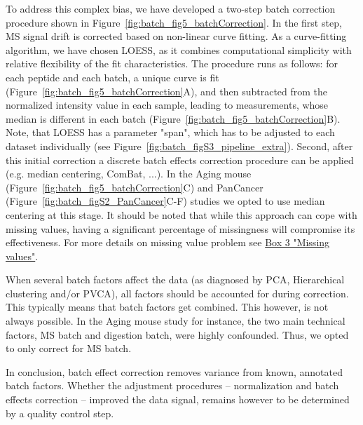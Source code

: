 \documentclass[num-refs]{wiley-article}
\begin{document}
To address this complex bias, we have developed a two-step batch correction procedure shown in Figure~\ref{fig:batch_fig5_batchCorrection}. In the first step, MS signal drift is corrected based on non-linear curve fitting. As a curve-fitting algorithm, we have chosen LOESS, as it combines computational simplicity with relative flexibility of the fit characteristics. The procedure runs as follows: for each peptide and each batch, a unique curve is fit (Figure~\ref{fig:batch_fig5_batchCorrection}A), and then subtracted from the normalized intensity value in each sample, leading to measurements, whose median is different in each batch (Figure~\ref{fig:batch_fig5_batchCorrection}B). Note, that LOESS has a parameter "span", which has to be adjusted to each dataset individually (see Figure~\ref{fig:batch_figS3_pipeline_extra}).   Second, after this initial correction a discrete batch effects correction procedure can be applied (e.g. median centering, ComBat, ...). In the Aging mouse (Figure~\ref{fig:batch_fig5_batchCorrection}C) and PanCancer (Figure~\ref{fig:batch_figS2_PanCancer}C-F) studies we opted to use median centering at this stage. It should be noted that while this approach can cope with missing values, having a significant percentage of missingness will compromise its effectiveness. For more details on missing value problem see \hyperref[box:Box3_missingness]{Box 3 "Missing values"}.

When several batch factors affect the data (as diagnosed by PCA, Hierarchical clustering and/or PVCA), all factors should be accounted for during correction. This typically means that batch factors get combined. This however, is not always possible. In the Aging mouse study for instance, the two main technical factors, MS batch and digestion batch, were highly confounded. Thus, we opted to only correct for MS batch.

In conclusion, batch effect correction removes variance from known, annotated batch factors. Whether the adjustment procedures – normalization and batch effects correction – improved the data signal, remains however to be determined by a quality control step.
\end{document}

